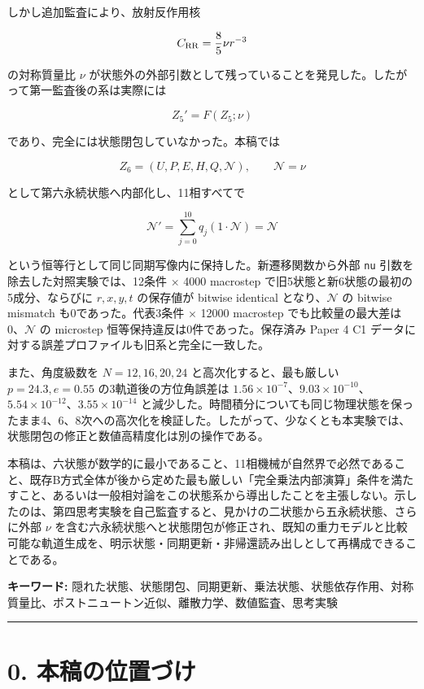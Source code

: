 \documentclass[
  a4paper,
]{ltjsarticle}
\begin{document}
しかし追加監査により、放射反作用核

\[
C_{\rm RR}=\frac85\nu r^{-3}
\]

の対称質量比 \(\nu\)
が状態外の外部引数として残っていることを発見した。したがって第一監査後の系は実際には

\[
Z_5'=F(Z_5;\nu)
\]

であり、完全には状態閉包していなかった。本稿では

\[
\boxed{
Z_6=(U,P,E,H,Q,\mathcal N),\qquad \mathcal N=\nu
}
\]

として第六永続状態へ内部化し、11相すべてで

\[
\mathcal N'=
\sum_{j=0}^{10}q_j(1\cdot\mathcal N)
=\mathcal N
\]

という恒等行として同じ同期写像内に保持した。新遷移関数から外部
\texttt{nu} 引数を除去した対照実験では、12条件 \(\times\) 4000 macrostep
で旧5状態と新6状態の最初の5成分、ならびに \(r,x,y,t\) の保存値が bitwise
identical となり、\(\mathcal N\) の bitwise mismatch
も0であった。代表3条件 \(\times\) 12000 macrostep
でも比較量の最大差は0、\(\mathcal N\) の microstep
恒等保持違反は0件であった。保存済み Paper 4 C1
データに対する誤差プロファイルも旧系と完全に一致した。

また、角度級数を \(N=12,16,20,24\) と高次化すると、最も厳しい
\(p=24.3,e=0.55\) の3軌道後の方位角誤差は
\(1.56\times10^{-7}\)、\(9.03\times10^{-10}\)、\(5.54\times10^{-12}\)、\(3.55\times10^{-14}\)
と減少した。時間積分についても同じ物理状態を保ったまま4、6、8次への高次化を検証した。したがって、少なくとも本実験では、状態閉包の修正と数値高精度化は別の操作である。

本稿は、六状態が数学的に最小であること、11相機械が自然界で必然であること、既存B方式全体が後から定めた最も厳しい「完全乗法内部演算」条件を満たすこと、あるいは一般相対論をこの状態系から導出したことを主張しない。示したのは、第四思考実験を自己監査すると、見かけの二状態から五永続状態、さらに外部
\(\nu\)
を含む六永続状態へと状態閉包が修正され、既知の重力モデルと比較可能な軌道生成を、明示状態・同期更新・非帰還読み出しとして再構成できることである。

\textbf{キーワード:}
隠れた状態、状態閉包、同期更新、乗法状態、状態依存作用、対称質量比、ポストニュートン近似、離散力学、数値監査、思考実験

\begin{center}\rule{0.5\linewidth}{0.5pt}\end{center}

\section{0.
本稿の位置づけ}\label{ux672cux7a3fux306eux4f4dux7f6eux3065ux3051}
\end{document}
